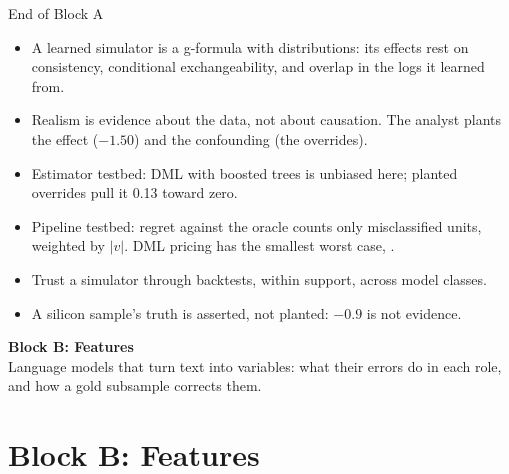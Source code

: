 \documentclass[aspectratio=169, 11pt, handout]{beamer}
\begin{document}
\begin{frame}{End of Block A}

\begin{itemize}
  \item A learned simulator is a g-formula with distributions: its effects rest on consistency, conditional exchangeability, and overlap in the logs it learned from.
  \item Realism is evidence about the data, not about causation. The analyst plants the effect ($-1.50$) and the confounding (the overrides).
  \item Estimator testbed: DML with boosted trees is unbiased here; planted overrides pull it 0.13 toward zero.
  \item Pipeline testbed: regret against the oracle counts only misclassified units, weighted by $|v|$. DML pricing has the smallest worst case, .
  \item Trust a simulator through backtests, within support, across model classes.
  \item A silicon sample's truth is asserted, not planted: $-0.9$ is not evidence.
\end{itemize}

\vfill

\begin{center}
\Large \textbf{Block B: Features}\\[0.4em]
\normalsize Language models that turn text into variables: what their errors do in each role, and how a gold subsample corrects them.
\end{center}
\vfill
\end{frame}

\section{Block B: Features}
\end{document}
